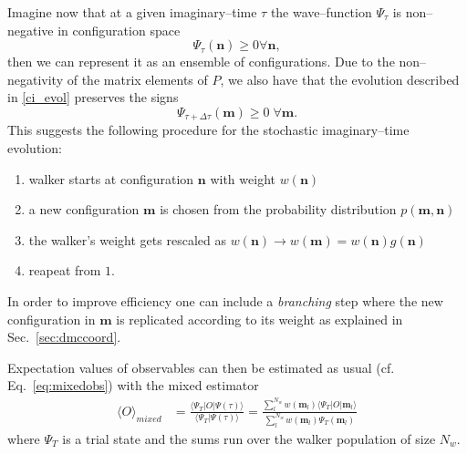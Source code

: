 Imagine now that at a given imaginary--time $\tau$ the wave--function $\Psi_{\tau}$ is non--negative in configuration 
space
\begin{equation}
\Psi_{\tau}(\mathbf{n}) \geq 0 \forall\mathbf{n} ,
\end{equation}
then we can represent it as an ensemble of configurations. Due to the non--negativity of the matrix elements of $P$, we also have
that the evolution described in \eqref{ci_evol} preserves the signs
\begin{equation}
\Psi_{\tau+\Delta\tau}(\mathbf{m}) \geq 0 \; \forall \mathbf{m} .
\end{equation}
This suggests the following procedure for the stochastic imaginary--time evolution: 
\begin{enumerate}
 \item walker starts at configuration $\mathbf{n}$ with weight $w(\mathbf{n})$
 \item a new configuration $\mathbf{m}$ is chosen from the probability distribution $p(\mathbf{m},\mathbf{n})$
 \item the walker's weight gets rescaled as $w(\mathbf{n}) \to w(\mathbf{m})=w(\mathbf{n})g(\mathbf{n})$
 \item reapeat from $1.$
\end{enumerate}
In order to improve efficiency one can include a {\it branching} step where the new configuration in $\mathbf{m}$
is replicated according to its weight as explained in Sec.~\ref{sec:dmccoord}.

Expectation values of observables can then be estimated as usual (cf. Eq.~\eqref{eq:mixedobs}) with the mixed estimator
\begin{equation}
\begin{split}
\langle O\rangle_{mixed} &= \frac{\langle \Psi_T\lvert O \rvert \Psi(\tau)\rangle}{\langle \Psi_T\vert \Psi(\tau)\rangle}= \frac{  \sum_l^{N_{w}} w(\mathbf{m}_{l}) \langle \Psi_T\lvert O \rvert \mathbf{m}_{l}\rangle}{\sum_l^{N_{w}}w(\mathbf{m}_{l})\Psi_T(\mathbf{m}_{l})}
\end{split}
\end{equation} 
where $\Psi_T$ is a trial state and the sums run over the walker population of size $N_w$.

